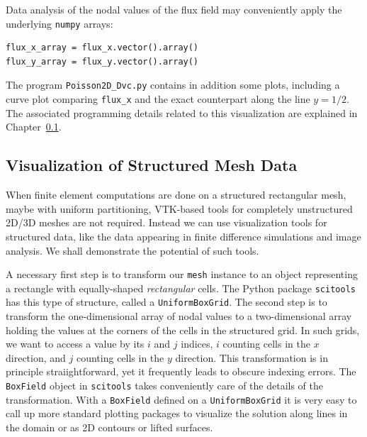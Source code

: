 Data analysis of the nodal values of the flux field may conveniently
apply the underlying {\fontsize{12pt}{12pt}\texttt{numpy}} arrays:
\begin{Verbatim}[fontsize=\fontsize{10pt}{10pt},tabsize=8,baselinestretch=1.05,
fontfamily=tt,xleftmargin=7mm]
flux_x_array = flux_x.vector().array()
flux_y_array = flux_y.vector().array()
\end{Verbatim}
\noindent

The program {\fontsize{12pt}{12pt}\verb!Poisson2D_Dvc.py!} contains in addition some plots,
including a curve plot
comparing {\fontsize{12pt}{12pt}\verb!flux_x!} and the exact counterpart along the line $y=1/2$.
The associated programming details related to this visualization
are explained in Chapter~\ref{langtangen:structviz}.

\subsection{Visualization of Structured Mesh Data}
\label{langtangen:structviz}

When finite element computations are done on
a structured rectangular mesh, maybe with uniform partitioning,
VTK-based tools for completely unstructured 2D/3D meshes are not required.
Instead we can use visualization
tools for structured data, like the data appearing
in finite difference simulations and image analysis.
We shall demonstrate the potential of such tools.

A necessary first step
is to transform our {\fontsize{12pt}{12pt}\texttt{mesh}} instance to an object representing a
rectangle with equally-shaped \emph{rectangular} cells.
The Python package {\fontsize{12pt}{12pt}\texttt{scitools}} has this type of structure, called
a {\fontsize{12pt}{12pt}\texttt{UniformBoxGrid}}. The second step is to transform the
one-dimensional array of nodal
values to a two-dimensional array holding the values at
the corners of the cells in the structured grid. In such
grids, we want to access a value by its $i$ and $j$ indices, $i$ counting
cells in the $x$ direction, and $j$ counting cells in the $y$ direction.
This transformation is in principle straiightforward, yet it frequently leads to
obscure indexing errors. The {\fontsize{12pt}{12pt}\texttt{BoxField}} object in {\fontsize{12pt}{12pt}\texttt{scitools}}
takes conveniently care of the details of the transformation.
With a {\fontsize{12pt}{12pt}\texttt{BoxField}} defined on a {\fontsize{12pt}{12pt}\texttt{UniformBoxGrid}} it is very easy to
call up more standard plotting packages to visualize the solution along
lines in the domain or as 2D contours or lifted surfaces.

